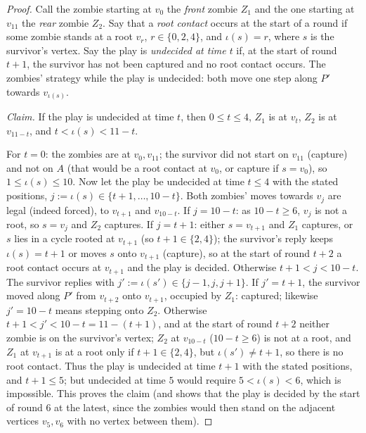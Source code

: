 \documentclass[11pt,a4paper]{article}
\theoremstyle{plain}
\theoremstyle{definition}
\theoremstyle{remark}
\newcommand{\idx}{\iota}
\begin{document}
\begin{proof}
Call the zombie starting at $v_0$ the \emph{front} zombie $Z_1$ and the one starting at $v_{11}$ the \emph{rear} zombie $Z_2$. Say that a \emph{root contact} occurs at the start of a round if some zombie stands at a root $v_r$, $r\in\{0,2,4\}$, and $\idx(s)=r$, where $s$ is the survivor's vertex. Say the play is \emph{undecided at time $t$} if, at the start of round $t+1$, the survivor has not been captured and no root contact occurs. The zombies' strategy while the play is undecided: both move one step along $P'$ towards $v_{\idx(s)}$.

\emph{Claim.} If the play is undecided at time $t$, then $0\le t\le4$, $Z_1$ is at $v_t$, $Z_2$ is at $v_{11-t}$, and $t<\idx(s)<11-t$.

For $t=0$: the zombies are at $v_0,v_{11}$; the survivor did not start on $v_{11}$ (capture) and not on $A$ (that would be a root contact at $v_0$, or capture if $s=v_0$), so $1\le\idx(s)\le10$. Now let the play be undecided at time $t\le4$ with the stated positions, $j:=\idx(s)\in\{t+1,\dots,10-t\}$. Both zombies' moves towards $v_j$ are legal (indeed forced), to $v_{t+1}$ and $v_{10-t}$. If $j=10-t$: as $10-t\ge6$, $v_j$ is not a root, so $s=v_j$ and $Z_2$ captures. If $j=t+1$: either $s=v_{t+1}$ and $Z_1$ captures, or $s$ lies in a cycle rooted at $v_{t+1}$ (so $t+1\in\{2,4\}$); the survivor's reply keeps $\idx(s)=t+1$ or moves $s$ onto $v_{t+1}$ (capture), so at the start of round $t+2$ a root contact occurs at $v_{t+1}$ and the play is decided. Otherwise $t+1<j<10-t$. The survivor replies with $j':=\idx(s')\in\{j-1,j,j+1\}$. If $j'=t+1$, the survivor moved along $P'$ from $v_{t+2}$ onto $v_{t+1}$, occupied by $Z_1$: captured; likewise $j'=10-t$ means stepping onto $Z_2$. Otherwise $t+1<j'<10-t=11-(t+1)$, and at the start of round $t+2$ neither zombie is on the survivor's vertex; $Z_2$ at $v_{10-t}$ ($10-t\ge6$) is not at a root, and $Z_1$ at $v_{t+1}$ is at a root only if $t+1\in\{2,4\}$, but $\idx(s')\ne t+1$, so there is no root contact. Thus the play is undecided at time $t+1$ with the stated positions, and $t+1\le5$; but undecided at time $5$ would require $5<\idx(s)<6$, which is impossible. This proves the claim (and shows that the play is decided by the start of round $6$ at the latest, since the zombies would then stand on the adjacent vertices $v_5,v_6$ with no vertex between them).


\end{proof}
\end{document}
